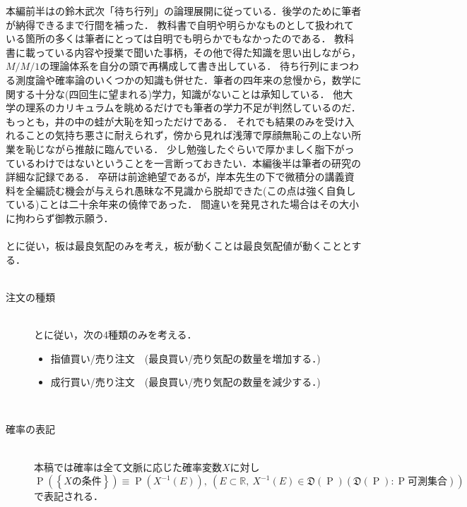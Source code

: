 \documentclass[a4j,papersize,disablejfam,slide,14pt]{jsarticle}
\def\prob#1{\operatorname{P} \left(\left\{ #1 \right\}\right)} %
\begin{document}
    本編前半は\cite{suzuki_queueing}の鈴木武次「待ち行列」の論理展開に従っている．後学のために筆者が納得できるまで行間を補った．
    教科書で自明や明らかなものとして扱われている箇所の多くは筆者にとっては自明でも明らかでもなかったのである．
    教科書に載っている内容や授業で聞いた事柄，その他で得た知識を思い出しながら，$M/M/1$の理論体系を自分の頭で再構成して書き出している．
    待ち行列にまつわる測度論や確率論のいくつかの知識も併せた．筆者の四年来の怠慢から，数学に関する十分な(四回生に望まれる)学力，知識がないことは承知している．
    他大学の理系のカリキュラムを眺めるだけでも筆者の学力不足が判然しているのだ．もっとも，井の中の蛙が大恥を知っただけである．
    それでも結果のみを受け入れることの気持ち悪さに耐えられず，傍から見れば浅薄で厚顔無恥この上ない所業を恥じながら推敲に臨んでいる．
    少し勉強したぐらいで厚かましく脂下がっているわけではないということを一言断っておきたい．本編後半は筆者の研究の詳細な記録である．
    卒研は前途絶望であるが，岸本先生の下で微積分の講義資料を全編読む機会が与えられ愚昧な不見識から脱却できた(この点は強く自負している)ことは二十余年来の僥倖であった．
    間違いを発見された場合はその大小に拘わらず御教示願う．\\
    \mbox{}\\
    \cite{endo_zuo_kishimoto}と\cite{li_hui_endo_kishimoto}に従い，板は最良気配のみを考え，板が動くことは最良気配値が動くこととする．\\
    \mbox{}\\
    \begin{description}
    	\item[注文の種類]\mbox{}\\
     	\cite{endo_zuo_kishimoto}と\cite{li_hui_endo_kishimoto}に従い，次の4種類のみを考える．
    	\begin{itemize}
    		\item 指値買い/売り注文　(最良買い/売り気配の数量を増加する．)
        	\item 成行買い/売り注文　(最良買い/売り気配の数量を減少する．)
    	\end{itemize}
        \mbox{}\\
        \item[確率の表記]\mbox{}\\
        	本稿では確率は全て文脈に応じた確率変数$X$に対し$\prob{\mbox{$X$の条件}} \equiv \operatorname{P}(X^{-1}(E)),
            \ (E \subset \mathbb{R},\ X^{-1}(E) \in \mathfrak{D}(\operatorname{P})(\mathfrak{D}(\operatorname{P}):\operatorname{P}\mbox{可測集合}))$で表記される．
     \end{description}
\end{document}
